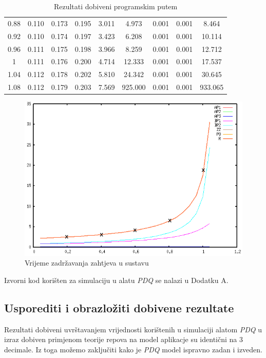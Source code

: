\documentclass[11pt]{article}
\begin{document}
\begin{table}[h!]
\begin{center}
\begin{tabular}{| c c c c c c c c c |}
0.88 & 0.110 & 0.173 & 0.195 & 3.011 & 4.973 & 0.001 & 0.001 & 8.464\\
0.92 & 0.110 & 0.174 & 0.197 & 3.423 & 6.208 & 0.001 & 0.001 & 10.114\\
0.96 & 0.111 & 0.175 & 0.198 & 3.966 & 8.259 & 0.001 & 0.001 & 12.712\\
1 & 0.111 & 0.176 & 0.200 & 4.714 & 12.333 & 0.001 & 0.001 & 17.537\\
1.04 & 0.112 & 0.178 & 0.202 & 5.810 & 24.342 & 0.001 & 0.001 & 30.645\\
1.08 & 0.112 & 0.179 & 0.203 & 7.569 & 925.000 & 0.001 & 0.001 & 933.065\\
    \hline
    \end{tabular}
  \end{center}
  \caption{Rezultati dobiveni programskim putem}
\end{table}


\begin{figure}[h!]
	\caption{Vrijeme zadržavanja zahtjeva u sustavu}
	\centering
	\includegraphics[width=1.2\textwidth]{graf.png}
\end{figure}

Izvorni kod korišten za simulaciju u alatu \emph{PDQ} se nalazi u Dodatku A.

\subsection{Usporediti i obrazložiti dobivene rezultate}

Rezultati dobiveni uvrštavanjem vrijednosti korištenih u simulaciji alatom \emph{PDQ} u izraz dobiven primjenom teorije repova na model aplikacje su identični na 3 decimale. Iz toga možemo zaključiti kako je \emph{PDQ} model ispravno zadan i izveden. 
\end{document}
